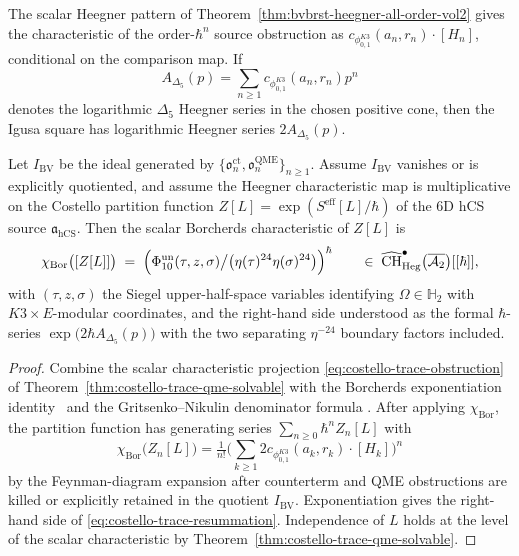 The scalar Heegner pattern of
Theorem~\ref{thm:bvbrst-heegner-all-order-vol2} gives the
characteristic of the order-$\hbar^n$ source obstruction as
\(c_{\phi_{0,1}^{K3}}(a_n,r_n)\cdot[H_n]\), conditional on the
comparison map. If
\[
A_{\Delta_5}(p)=\sum_{n\geq1}c_{\phi_{0,1}^{K3}}(a_n,r_n)p^n
\]
denotes the logarithmic \(\Delta_5\) Heegner series in the chosen
positive cone, then the Igusa square has logarithmic Heegner series
\(2A_{\Delta_5}(p)\).

\begin{theorem}
\label{thm:costello-trace-resummation}
Let \(I_{\mathrm{BV}}\) be the ideal generated by
\(\{\mathfrak{o}^{\mathrm{ct}}_n,\mathfrak{o}^{\mathrm{QME}}_n\}_{n\ge1}\).
Assume \(I_{\mathrm{BV}}\) vanishes or is explicitly quotiented, and
assume the Heegner characteristic map is multiplicative on the
Costello partition function
\(Z[L]=\exp(S^{\mathrm{eff}}[L]/\hbar)\) of the 6D hCS source
\(\mathfrak a_{\mathrm{hCS}}\). Then the scalar Borcherds
characteristic of \(Z[L]\) is
\begin{equation}\label{eq:costello-trace-resummation}
 \chi_{\mathrm{Bor}}\bigl([Z[L]]\bigr)
 \;=\;
 \Bigl(\Phi_{10}^{\mathrm{un}}(\tau,z,\sigma)\big/
 \bigl(\eta(\tau)^{24}\eta(\sigma)^{24}\bigr)\Bigr)^{\hbar}
 \qquad\in\;
 \widehat{\mathrm{CH}}^\bullet_{\mathrm{Heg}}
 \bigl(\overline{\mathcal{A}_2}\bigr)[[\hbar]],
\end{equation}
with $(\tau, z, \sigma)$ the Siegel upper-half-space variables
identifying $\Omega\in\mathbb{H}_2$ with $K3\times E$-modular
coordinates, and the right-hand side understood as the formal
$\hbar$-series
\(\exp\bigl(2\hbar A_{\Delta_5}(p)\bigr)\) with the two separating
\(\eta^{-24}\) boundary factors included.
\end{theorem}

\begin{proof}
Combine the scalar characteristic projection
\eqref{eq:costello-trace-obstruction} of
Theorem~\ref{thm:costello-trace-qme-solvable} with the Borcherds
exponentiation identity~\cite[Theorem 10.1]{Borcherds1998} and the
Gritsenko--Nikulin denominator formula
\cite[Thm.~2.1]{GritsenkoNikulin1998}. After applying
\(\chi_{\mathrm{Bor}}\), the partition function has generating series
$\sum_{n\geq 0}\hbar^n Z_n[L]$ with
\[
\chi_{\mathrm{Bor}}\bigl(Z_n[L]\bigr) = \tfrac{1}{n!}
\bigl(\sum_{k\geq 1}2c_{\phi_{0,1}^{K3}}(a_k,r_k)\cdot[H_k]\bigr)^{n}
\]
by the Feynman-diagram expansion after counterterm and QME obstructions
are killed or explicitly retained in the quotient
\(I_{\mathrm{BV}}\).
Exponentiation gives the right-hand side of
\eqref{eq:costello-trace-resummation}.
Independence of $L$ holds at the level of the scalar characteristic by
Theorem~\ref{thm:costello-trace-qme-solvable}.
\end{proof}

